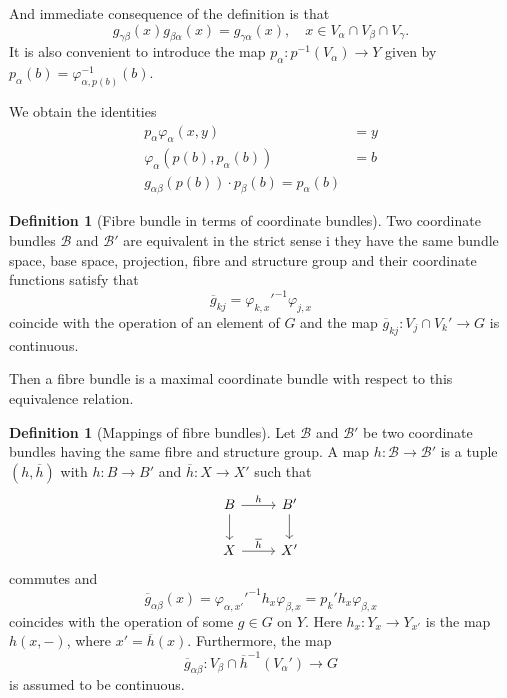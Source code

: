 \documentclass[reqno]{amsart}
\theoremstyle{definition}
\newtheorem{definition}[theorem]{Definition}
\theoremstyle{remark}
\begin{document}
And immediate consequence of the definition is that
\[
g_{\gamma \beta} (x) g_{\beta \alpha}(x) = 
g_{\gamma \alpha}(x), \quad x \in V_{\alpha} \cap V_{\beta}
\cap V_{\gamma}.
\] 
It is also convenient to introduce the map
$p_{\alpha} \colon p^{-1}(V_{\alpha}) \to Y$ given by
$p_{\alpha}(b) = \varphi_{\alpha,p(b)}^{-1}(b)$.

We obtain the identities
\begin{align*}
    p_\alpha \varphi_\alpha (x,y) &= y\\
    \varphi_\alpha \left( p(b), p_\alpha(b) \right) &= b\\
    g_{\alpha \beta}\left( p(b) \right) \cdot 
    p_\beta(b) = p_\alpha(b)
\end{align*}

\begin{definition}[Fibre bundle in terms of coordinate bundles]
    Two coordinate bundles
    $\mathcal{B}$ and $\mathcal{B}'$ are
    equivalent in the strict sense i they
    have the same bundle space, base space, projection,
    fibre and structure group and their coordinate functions
    satisfy that
    \[
    \overline{g}_{kj} = \varphi_{k,x}'^{-1} \varphi_{j,x}
    \] 
    coincide with the operation of an element of $G$ and the
    map
    $\overline{g}_{kj} \colon
    V_j \cap V_{k}' \to G$ is continuous.

    Then a fibre bundle is a maximal coordinate bundle
    with respect to this equivalence relation.
\end{definition}

\begin{definition}[Mappings of fibre bundles]
    Let $\mathcal{B}$ and $\mathcal{B}'$ be two
    coordinate bundles having the same fibre and structure group.
    A map $h \colon \mathcal{B} \to \mathcal{B}'$ 
    is a tuple 
    $\left( h, \overline{h} \right) $ with
    $h \colon B \to B'$ and $\overline{h} \colon X \to X'$ 
    such that
    \begin{equation*}
    \begin{tikzcd}
        B \ar[d] \ar[r, "h"] & B' \ar[d] \\
        X \ar[r, "\overline{h}"] & X'
    \end{tikzcd}
    \end{equation*}
    commutes and
    \[
    \overline{g}_{\alpha \beta}(x) = 
    \varphi_{\alpha, x'}'^{-1} h_x \varphi_{\beta ,x} =
    p_k' h_x \varphi_{\beta, x}
    \] 
    coincides with the operation of some $g \in G$ on
    $Y$. Here $h_x \colon Y_x \to Y_{x'}$ is the map
    $h(x,-)$, where $x' = \overline{h}(x)$.
    Furthermore, the map
    \[
    \overline{g}_{\alpha \beta}\colon
    V_{\beta} \cap \overline{h}^{-1}\left( V_{\alpha}' \right) 
    \to G
    \] is assumed to be continuous.
\end{definition}
\end{document}
